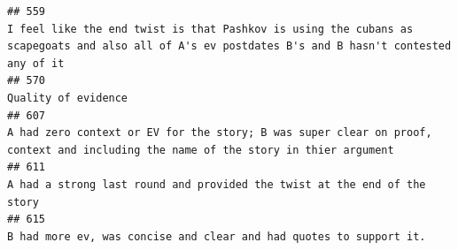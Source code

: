 \documentclass[
]{article}
\begin{document}
\begin{verbatim}
## 559                                                                                                                                                                                                                                                                                                                                                                                                                                                  I feel like the end twist is that Pashkov is using the cubans as scapegoats and also all of A's ev postdates B's and B hasn't contested any of it
## 570                                                                                                                                                                                                                                                                                                                                                                                                                                                                                                                                                                                Quality of evidence
## 607                                                                                                                                                                                                                                                                                                                                                                                                                                                                  A had zero context or EV for the story; B was super clear on proof, context and including the name of the story in thier argument
## 611                                                                                                                                                                                                                                                                                                                                                                                                                                                                                                                           A had a strong last round and provided the twist at the end of the story
## 615                                                                                                                                                                                                                                                                                                                                                                                                                                                                                                                                 B had more ev, was concise and clear and had quotes to support it.

\end{verbatim}
\end{document}
